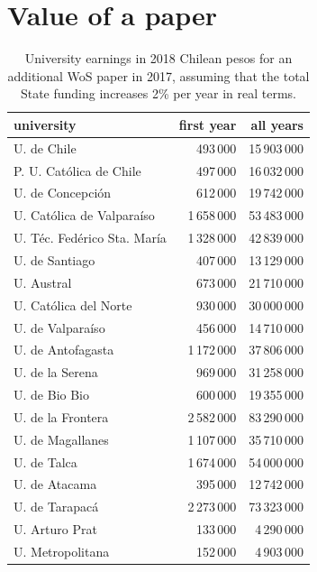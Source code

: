 \documentclass[twocolumn]{article}
\begin{document}
\section{Value of a paper}
\begin{table}
\centering
\caption{University earnings in 2018 Chilean pesos for an additional 
WoS paper in 2017, assuming that the total State funding increases 
2\% per  year in real terms.}
\label{tab:papercost}
\begin{tabular}{lrr}
\hline\hline                             
university                   &  first year &  all years\\              
\hline                                                        
U. de Chile                  &    493\,000 &  15\,903\,000\\  
P. U. Católica de Chile      &    497\,000 &  16\,032\,000\\
U. de Concepción             &    612\,000 &  19\,742\,000\\
U. Católica de Valparaíso    & 1\,658\,000 &  53\,483\,000\\
U. Téc. Fedérico Sta. María  & 1\,328\,000 &  42\,839\,000\\
U. de Santiago               &    407\,000 &  13\,129\,000\\
U. Austral                   &    673\,000 &  21\,710\,000\\
U. Católica del Norte        &    930\,000 &  30\,000\,000\\
U. de Valparaíso             &    456\,000 &  14\,710\,000\\
U. de Antofagasta            & 1\,172\,000 &  37\,806\,000\\
U. de la Serena              &    969\,000 &  31\,258\,000\\
U. de Bio Bio                &    600\,000 &  19\,355\,000\\
U. de la Frontera            & 2\,582\,000 &  83\,290\,000\\
U. de Magallanes             & 1\,107\,000 &  35\,710\,000\\
U. de Talca                  & 1\,674\,000 &  54\,000\,000\\
U. de Atacama                &    395\,000 &  12\,742\,000\\
U. de Tarapacá               & 2\,273\,000 &  73\,323\,000\\
U. Arturo Prat               &    133\,000 &   4\,290\,000\\
U. Metropolitana             &    152\,000 &   4\,903\,000\\

\end{tabular}
\end{table}
\end{document}
